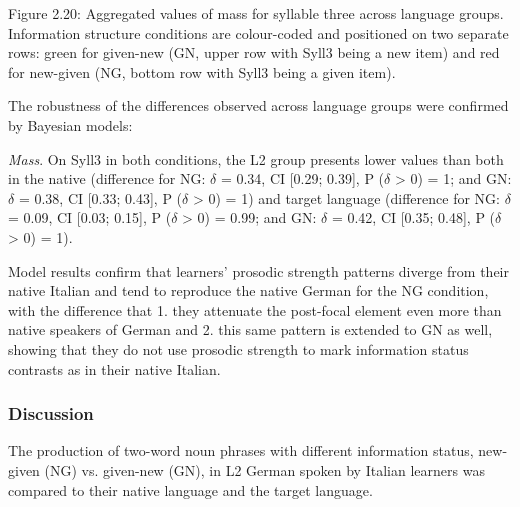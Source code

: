 \begin{styleStandard}
  [Warning: Image ignored] %
 
\end{styleStandard}

\begin{stylecaption}
Figure 2.20: Aggregated values of mass for syllable three across language groups. Information structure conditions are colour-coded and positioned on two separate rows: green for given-new (GN, upper row with Syll3 being a new item) and red for new-given (NG, bottom row with Syll3 being a given item).
\end{stylecaption}

\begin{styleStandard}
The robustness of the differences observed across language groups were confirmed by Bayesian models:
\end{styleStandard}

\begin{listWWNumiiileveli}
\item 
\begin{stylelsBulletList}
\textit{Mass}. On Syll3 in both conditions, the L2 group presents lower values than both in the native (difference for NG: $\delta $ = 0.34, CI [0.29; 0.39], P ($\delta $ {\textgreater} 0) = 1; and GN: $\delta $ = 0.38, CI [0.33; 0.43], P ($\delta $ {\textgreater} 0) = 1) and target language (difference for NG: $\delta $ = 0.09, CI [0.03; 0.15], P ($\delta $ {\textgreater} 0) = 0.99; and GN: $\delta $ = 0.42, CI [0.35; 0.48], P ($\delta $ {\textgreater} 0) = 1).
\end{stylelsBulletList}
\end{listWWNumiiileveli}
\begin{styleStandard}
Model results confirm that learners’ prosodic strength patterns diverge from their native Italian and tend to reproduce the native German for the NG condition, with the difference that 1. they attenuate the post-focal element even more than native speakers of German and 2. this same pattern is extended to GN as well, showing that they do not use prosodic strength to mark information status contrasts as in their native Italian. 
\end{styleStandard}

\subsubsection[Discussion]{Discussion}
\hypertarget{Toc191305914}{}\begin{styleStandard}
The production of two-word noun phrases with different information status, new-given (NG) vs. given-new (GN), in L2 German spoken by Italian learners was compared to their native language and the target language.
\end{styleStandard}

